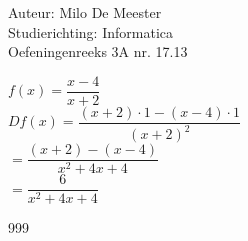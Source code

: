 \documentclass[a4paper]{article}
\begin{document}
  
\noindent \large Auteur: Milo De Meester \\
\noindent \large Studierichting: Informatica\\
\noindent \large Oefeningenreeks 3A nr. 17.13\\

\medskip

\normalsize

$f(x) = \dfrac{x-4}{x+2}$\\

$Df(x) = \dfrac{(x+2)\cdot1 - (x-4) \cdot 1}{(x+2)^2}$\\

$= \dfrac{(x+2)-(x-4)}{x^2+4x+4}$\\

$= \dfrac{6}{x^2+4x+4}$\\

\begin{thebibliography}{999}
\end{thebibliography}
\end{document}
